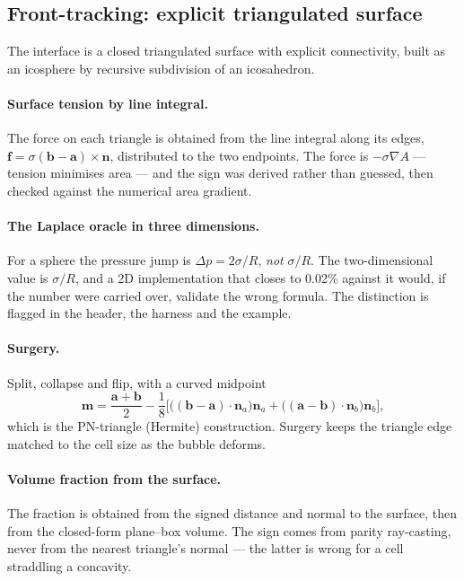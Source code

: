 \subsection{Front-tracking: explicit triangulated surface}

The interface is a closed triangulated surface with explicit connectivity,
built as an icosphere by recursive subdivision of an icosahedron.

\paragraph{Surface tension by line integral.}
The force on each triangle is obtained from the line integral along its edges,
$\mathbf{f} = \sigma(\mathbf{b}-\mathbf{a})\times\mathbf{n}$, distributed to the
two endpoints. The force is $-\sigma\nabla A$ --- tension minimises area ---
and the sign was derived rather than guessed, then checked against the numerical
area gradient.

\paragraph{The Laplace oracle in three dimensions.}
For a sphere the pressure jump is $\Delta p = 2\sigma/R$, \emph{not} $\sigma/R$.
The two-dimensional value is $\sigma/R$, and a 2D implementation that closes to
0.02\% against it would, if the number were carried over, validate the wrong
formula. The distinction is flagged in the header, the harness and the example.

\paragraph{Surgery.}
Split, collapse and flip, with a curved midpoint
\begin{equation}
\mathbf{m} = \frac{\mathbf{a}+\mathbf{b}}{2}
  - \frac{1}{8}\Big[\big((\mathbf{b}-\mathbf{a})\cdot\mathbf{n}_a\big)\mathbf{n}_a
  + \big((\mathbf{a}-\mathbf{b})\cdot\mathbf{n}_b\big)\mathbf{n}_b\Big],
\end{equation}
which is the PN-triangle (Hermite) construction. Surgery keeps the triangle
edge matched to the cell size as the bubble deforms.

\paragraph{Volume fraction from the surface.}
The fraction is obtained from the signed distance and normal to the surface,
then from the closed-form plane--box volume. The sign comes from parity
ray-casting, never from the nearest triangle's normal --- the latter is wrong
for a cell straddling a concavity.

